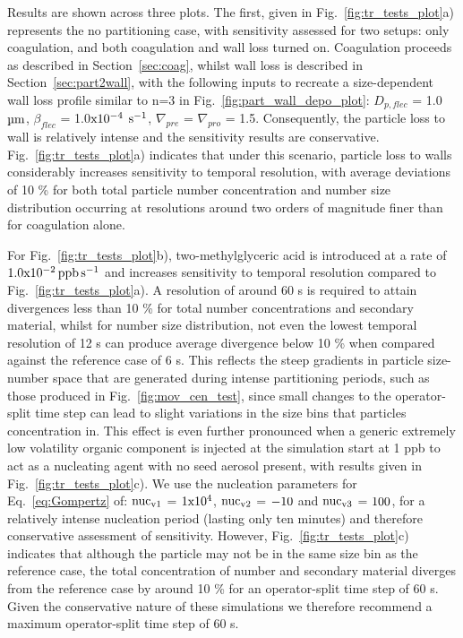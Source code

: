 \documentclass[gmd, manuscript]{copernicus}
\begin{document}
Results are shown across three plots.  The first, given in Fig.~\ref{fig:tr_tests_plot}a) represents the no partitioning case, with sensitivity assessed for two setups: only coagulation, and both coagulation and wall loss turned on.  Coagulation proceeds as described in Section~\ref{sec:coag}, whilst wall loss is described in Section~\ref{sec:part2wall}, with the following inputs to recreate a size-dependent wall loss profile similar to n=3 in Fig.~\ref{fig:part_wall_depo_plot}: $D_{p,flec}$ = 1.0 $\rm{\mu m}$, $\beta_{flec}$ = 1.0$\rm{x10^{-4}}$ $\rm{s^{-1}}$, $\nabla_{pre}$ = $\nabla_{pro}$ = 1.5.  Consequently, the particle loss to wall is relatively intense and the sensitivity results are conservative.  Fig.~\ref{fig:tr_tests_plot}a) indicates that under this scenario, particle loss to walls considerably increases sensitivity to temporal resolution, with average deviations of 10 \% for both total particle number concentration and number size distribution occurring at resolutions around two orders of magnitude finer than for coagulation alone.

For Fig.~\ref{fig:tr_tests_plot}b), two-methylglyceric acid is introduced at a rate of $\rm{1.0x10^{-2}\, ppb \, s^{-1}}$ and increases sensitivity to temporal resolution compared to Fig.~\ref{fig:tr_tests_plot}a).  A resolution of around 60 s is required to attain divergences less than 10 \% for total number concentrations and secondary material, whilst for number size distribution, not even the lowest temporal resolution of 12 s can produce average divergence below 10 \% when compared against the reference case of 6 s.  This reflects the steep gradients in particle size-number space that are generated during intense partitioning periods, such as those produced in Fig.~\ref{fig:mov_cen_test}, since small changes to the operator-split time step can lead to slight variations in the size bins that particles concentration in.  This effect is even further pronounced when a generic extremely low volatility organic component is injected at the simulation start at 1 ppb to act as a nucleating agent with no seed aerosol present, with results given in Fig.~\ref{fig:tr_tests_plot}c).  We use the nucleation parameters for Eq.~\ref{eq:Gompertz} of: $\rm{nuc_{v1}}$ = $\rm{1x10^4}$, $\rm{nuc_{v2}}$ = $\rm{-10}$ and $\rm{nuc_{v3}}$ = $\rm{100}$, for a relatively intense nucleation period (lasting only ten minutes) and therefore conservative assessment of sensitivity.  However, Fig.~\ref{fig:tr_tests_plot}c) indicates that although the particle may not be in the same size bin as the reference case, the total concentration of number and secondary material diverges from the reference case by around 10 \% for an operator-split time step of 60 s.  Given the conservative nature of these simulations we therefore recommend a maximum operator-split time step of 60 s.
\end{document}
